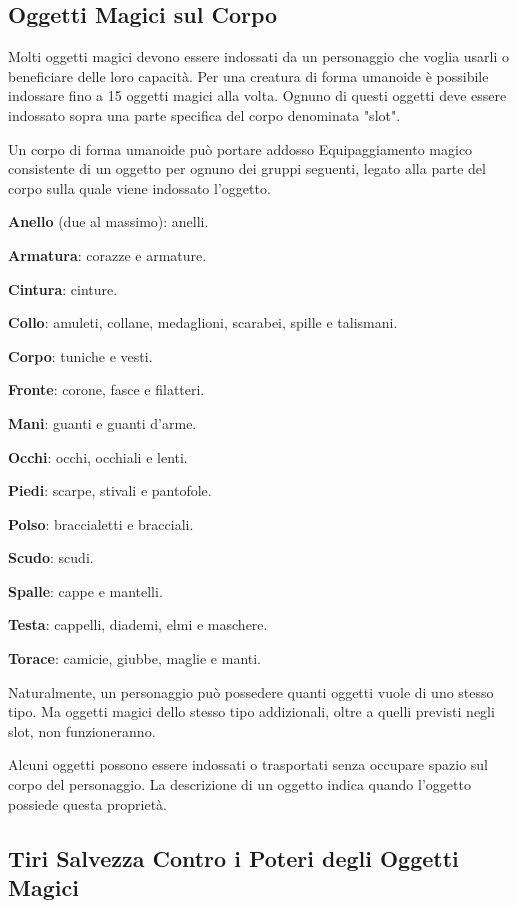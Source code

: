 \documentclass[a4paper,11pt,twoside,openany]{book}
\begin{document}
\subsection{Oggetti Magici sul Corpo}

\label{oggetti-magici-sul-corpo}

Molti oggetti magici devono essere indossati da un personaggio che voglia usarli o beneficiare delle loro capacità. Per una creatura di forma umanoide è possibile indossare fino a 15 oggetti magici alla volta. Ognuno di questi oggetti deve essere indossato sopra una parte specifica del corpo denominata "slot".

Un corpo di forma umanoide può portare addosso Equipaggiamento magico consistente di un oggetto per ognuno dei gruppi seguenti, legato alla parte del corpo sulla quale viene indossato l'oggetto.

\textbf{Anello} (due al massimo): anelli.

\textbf{Armatura}: corazze e armature.

\textbf{Cintura}: cinture.

\textbf{Collo}: amuleti, collane, medaglioni, scarabei, spille e talismani.

\textbf{Corpo}: tuniche e vesti.

\textbf{Fronte}: corone, fasce e filatteri.

\textbf{Mani}: guanti e guanti d'arme.

\textbf{Occhi}: occhi, occhiali e lenti.

\textbf{Piedi}: scarpe, stivali e pantofole.

\textbf{Polso}: braccialetti e bracciali.

\textbf{Scudo}: scudi.

\textbf{Spalle}: cappe e mantelli.

\textbf{Testa}: cappelli, diademi, elmi e maschere.

\textbf{Torace}: camicie, giubbe, maglie e manti.

Naturalmente, un personaggio può possedere quanti oggetti vuole di uno stesso tipo. Ma oggetti magici dello stesso tipo addizionali, oltre a quelli previsti negli slot, non funzioneranno.

Alcuni oggetti possono essere indossati o trasportati senza occupare spazio sul corpo del personaggio. La descrizione di un oggetto indica quando l'oggetto possiede questa proprietà.


\subsection{Tiri Salvezza Contro i Poteri degli Oggetti Magici}
\end{document}
